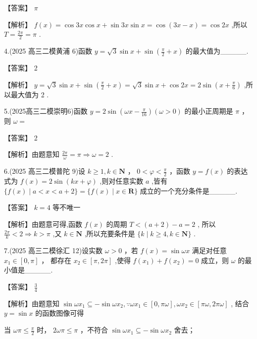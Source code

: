 \documentclass[10pt]{article}
\newcommand*\circled[1]{\tikz[baseline=(char.base)]{\node[shape=circle,draw,inner sep=1.5pt] (char) {\small #1};}}
\begin{document}
【答案】 \(\pi\)

【解析】 \(f\left( x\right)  = \cos {3x}\cos x + \sin {3x}\sin x = \cos \left( {{3x} - x}\right)  = \cos {2x}\) ,所以 \(T = \frac{2\pi }{2} = \pi\) .

4.(2025 高三二模黄浦 6)函数 \(y = \sqrt{3}\sin x + \sin \left( {\frac{\pi }{2} + x}\right)\) 的最大值为\_\_\_\_\_.

【答案】 2

【解析】 \(y = \sqrt{3}\sin x + \sin \left( {\frac{\pi }{2} + x}\right)  = \sqrt{3}\sin x + \cos {2x} = 2\sin \left( {x + \frac{\pi }{6}}\right)\) ,所以最大值为 2 .

5.(2025高三二模崇明6)函数 \(y = 2\sin \left( {{\omega x} - \frac{\pi }{16}}\right) \left( {\omega  > 0}\right)\) 的最小正周期是 \(\pi\) ，则 \(\omega  =\)

【答案】 2

【解析】由题意知 \(\frac{2\pi }{\omega } = \pi  \Rightarrow  \omega  = 2\) .

6.(2025 高三二模普陀 9)设 \(k \geq  1,k \in  \mathbf{N}\) ， \(0 < \varphi  < \frac{\pi }{2}\) ，函数 \(y = f\left( x\right)\) 的表达式为 \(f\left( x\right)  = 2\sin \left( {{kx} + \varphi }\right)\) ,则对任意实数 \(a\) ,皆有 \(\{ f\left( x\right)  \mid  a < x < a + 2\}  = \{ f\left( x\right)  \mid  x \in  \mathbf{R}\}\) 成立的一个充分条件是\_\_\_\_\_.

【答案】 \(k = 4\) 等不唯一

【解析】由题意可得,函数 \(f\left( x\right)\) 的周期 \(T < \left( {a + 2}\right)  - a = 2\) , 所以 \(\frac{2\pi }{k} < 2 \Rightarrow  k > \pi\) ,又 \(k \in  \mathbf{N}\) ,所以充要条件是 \(\{ k \mid  k \geq  4,k \in  \mathbf{N}\}\) .

7.(2025 高三二模徐汇 12)设实数 \(\omega  > 0\) ，若 \(f\left( x\right)  = \sin {\omega x}\) 满足对任意 \({x}_{1} \in  \left\lbrack  {0,\pi }\right\rbrack\) ， 都存在 \({x}_{2} \in  \left\lbrack  {\pi ,{2\pi }}\right\rbrack\) ,使得 \(f\left( {x}_{1}\right)  + f\left( {x}_{2}\right)  = 0\) 成立，则 \(\omega\) 的最小值是\_\_\_\_\_.

【答案】 \(\frac{3}{4}\)

【解析】由题意知 \(\sin \omega {x}_{1} \subseteq   - \sin \omega {x}_{2},\because \omega {x}_{1} \in  \left\lbrack  {0,{\pi \omega }}\right\rbrack  ,\omega {x}_{2} \in  \left\lbrack  {{\pi \omega },{2\pi \omega }}\right\rbrack\) , 结合 \(y = \sin x\) 的函数图像可得

 \circled{1}  当 \({\omega \pi } \leq  \frac{\pi }{2}\) 时， \({2\omega \pi } \leq  \pi\) ，不符合 \(\sin \omega {x}_{1} \subseteq   - \sin \omega {x}_{2}\) 舍去；
\end{document}
